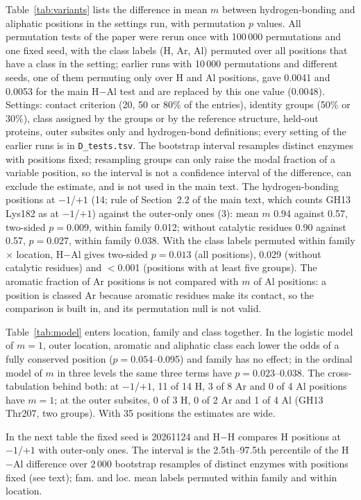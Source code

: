 \documentclass[preprint,12pt]{elsarticle}
\begin{document}
Table~\ref{tab:variants} lists the difference in mean $m$ between hydrogen-bonding and aliphatic positions in the
settings run, with permutation $p$ values. All permutation tests of the paper were rerun once with 100\,000
permutations and one fixed seed, with the class labels (H, Ar, Al) permuted over all positions that have a class in the
setting; earlier runs with 10\,000 permutations and different seeds, one of them permuting only over H and Al
positions, gave 0.0041 and 0.0053 for the main H$-$Al test and are replaced by this one value (0.0048). Settings:
contact criterion (20, 50 or 80\% of the entries), identity groups (50\% or 30\%), class assigned by the groups or by
the reference structure, held-out proteins, outer subsites only and hydrogen-bond definitions; every setting of the
earlier runs is in \texttt{D\_tests.tsv}. The bootstrap interval resamples distinct enzymes with positions fixed;
resampling groups can only raise the modal fraction of a variable position, so the interval is not a confidence
interval of the difference, can exclude the estimate, and is not used in the main text. The hydrogen-bonding positions
at $-1$/$+1$ (14; rule of Section~2.2 of the main text, which counts GH13 Lys182 as at $-1$/$+1$) against the
outer-only ones (3): mean $m$ 0.94 against 0.57, two-sided $p = 0.009$, within family 0.012; without catalytic
residues 0.90 against 0.57, $p = 0.027$, within family 0.038. With the class labels permuted within family $\times$
location, H$-$Al gives two-sided $p = 0.013$ (all positions), 0.029 (without catalytic residues) and $<$0.001
(positions with at least five groups). The aromatic fraction of Ar positions is not compared with $m$ of Al positions:
a position is classed Ar because aromatic residues make its contact, so the comparison is built in, and its
permutation null is not valid.

Table~\ref{tab:model} enters location, family and class together. In the logistic model of $m = 1$, outer location,
aromatic and aliphatic class each lower the odds of a fully conserved position ($p = 0.054$--0.095) and family has no
effect; in the ordinal model of $m$ in three levels the same three terms have $p = 0.023$--0.038. The cross-tabulation
behind both: at $-1$/$+1$, 11 of 14 H, 3 of 8 Ar and 0 of 4 Al positions have $m = 1$; at the outer subsites, 0 of 3
H, 0 of 2 Ar and 1 of 4 Al (GH13 Thr207, two groups). With 35 positions the estimates are wide.

In the next table the fixed seed is 20261124 and H$-$H compares H positions at $-1$/$+1$ with outer-only ones. The interval is the 2.5th--97.5th percentile of the H$-$Al difference over 2\,000 bootstrap resamples of distinct enzymes with positions fixed (see text); fam. and loc. mean labels permuted within family and within location.
\end{document}
